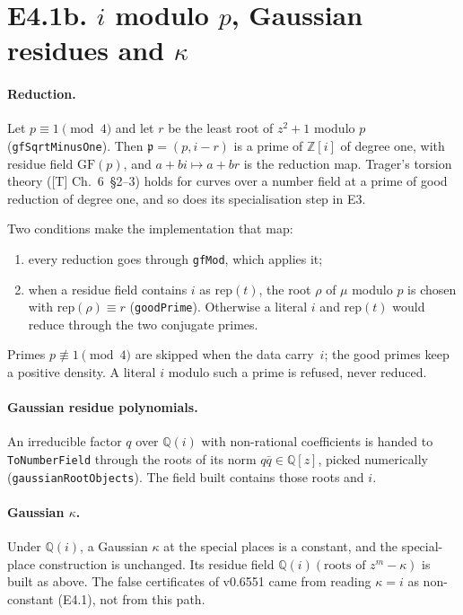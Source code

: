 \documentclass[11pt]{article}
\theoremstyle{definition}
\theoremstyle{remark}
\newcommand{\Q}{\mathbb{Q}}
\newcommand{\Z}{\mathbb{Z}}
\newcommand{\code}[1]{\texttt{#1}}
\begin{document}
\section*{E4.1b. $i$ modulo $p$, Gaussian residues and $\kappa$}

\paragraph{Reduction.} Let $p\equiv1\pmod4$ and let $r$ be the least root of
$z^2+1$ modulo $p$ (\code{gfSqrtMinusOne}). Then $\mathfrak p=(p,i-r)$ is a
prime of $\Z[i]$ of degree one, with residue field $\mathrm{GF}(p)$, and
$a+bi\mapsto a+br$ is the reduction map. Trager's torsion theory ([T]
Ch.~6~\S2--3) holds for curves over a number field at a prime of good reduction
of degree one, and so does its specialisation step in E3.

Two conditions make the implementation that map:
\begin{enumerate}
\item every reduction goes through \code{gfMod}, which applies it;
\item when a residue field contains $i$ as $\mathrm{rep}(t)$, the root $\rho$ of
  $\mu$ modulo $p$ is chosen with $\mathrm{rep}(\rho)\equiv r$
  (\code{goodPrime}). Otherwise a literal $i$ and $\mathrm{rep}(t)$ would reduce
  through the two conjugate primes.
\end{enumerate}
Primes $p\not\equiv1\pmod4$ are skipped when the data carry~$i$; the good
primes keep a positive density. A literal $i$ modulo such a prime is refused,
never reduced.

\paragraph{Gaussian residue polynomials.} An irreducible factor $q$ over $\Q(i)$
with non-rational coefficients is handed to \code{ToNumberField} through the
roots of its norm $q\bar q\in\Q[z]$, picked numerically
(\code{gaussianRootObjects}). The field built contains those roots and $i$.

\paragraph{Gaussian $\kappa$.} Under $\Q(i)$, a Gaussian $\kappa$ at the special
places is a constant, and the special-place construction is unchanged. Its
residue field $\Q(i)(\text{roots of }z^m-\kappa)$ is built as above. The
false certificates of v0.6551 came from reading $\kappa=i$ as non-constant
(E4.1), not from this path.
\end{document}
